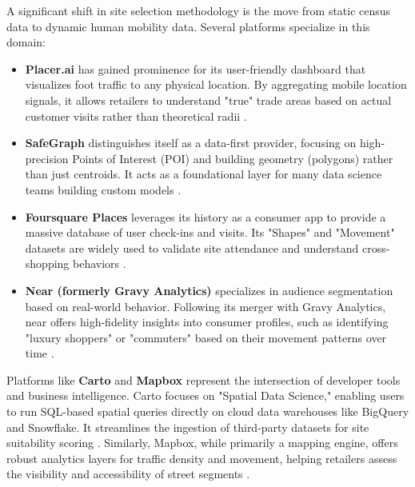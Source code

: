 \par A significant shift in site selection methodology is the move from static census data to dynamic human mobility data. Several platforms specialize in this domain:
\begin{itemize}
    \item \textbf{Placer.ai} has gained prominence for its user-friendly dashboard that visualizes foot traffic to any physical location. By aggregating mobile location signals, it allows retailers to understand "true" trade areas based on actual customer visits rather than theoretical radii \citep{placer_2025}.
    \item \textbf{SafeGraph} distinguishes itself as a data-first provider, focusing on high-precision Points of Interest (POI) and building geometry (polygons) rather than just centroids. It acts as a foundational layer for many data science teams building custom models \citep{safegraph_2024, kang_2020}.
    \item \textbf{Foursquare Places} leverages its history as a consumer app to provide a massive database of user check-ins and visits. Its "Shapes" and "Movement" datasets are widely used to validate site attendance and understand cross-shopping behaviors \citep{foursquare_2024}.
    \item \textbf{Near (formerly Gravy Analytics)} specializes in audience segmentation based on real-world behavior. Following its merger with Gravy Analytics, near offers high-fidelity insights into consumer profiles, such as identifying "luxury shoppers" or "commuters" based on their movement patterns over time \citep{near_2023}.
\end{itemize}

\par Platforms like \textbf{Carto} and \textbf{Mapbox} represent the intersection of developer tools and business intelligence. Carto focuses on "Spatial Data Science," enabling users to run SQL-based spatial queries directly on cloud data warehouses like BigQuery and Snowflake. It streamlines the ingestion of third-party datasets for site suitability scoring \citep{carto_2024}. Similarly, Mapbox, while primarily a mapping engine, offers robust analytics layers for traffic density and movement, helping retailers assess the visibility and accessibility of street segments \citep{mapbox_2024}.

